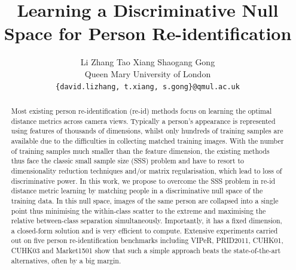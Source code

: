 \documentclass[10pt,twocolumn,letterpaper]{article}
\begin{document}
\title{Learning a Discriminative Null Space for Person Re-identification}
\author{Li Zhang \quad \quad Tao Xiang \quad \quad Shaogang Gong\\
Queen Mary University of London\\
{\tt\small \{david.lizhang, t.xiang, s.gong\}@qmul.ac.uk}
}

\maketitle

\begin{abstract}
Most existing person re-identification (re-id) methods focus on learning the optimal distance metrics across camera views. Typically a person's appearance is represented using features of thousands of dimensions, whilst only hundreds of training samples are available due to the difficulties in collecting matched training images. With the number of training samples much smaller than the feature dimension, the existing methods thus face the classic small sample size (SSS) problem and have to resort to dimensionality reduction techniques and/or matrix regularisation, which lead to loss of discriminative power. In this work, we propose to overcome the SSS problem in re-id distance metric learning by matching people in a discriminative  null space of the training data. In this null space, images of the same person are collapsed into a single point thus minimising the within-class scatter to the extreme and maximising the relative between-class separation simultaneously. Importantly, it has a fixed dimension, a closed-form solution and is very efficient to compute. Extensive experiments carried out on five person re-identification benchmarks including VIPeR, PRID2011, CUHK01, CUHK03 and Market1501 show that such a simple approach beats the state-of-the-art alternatives, often by a big margin.
\end{abstract}

\end{document}
